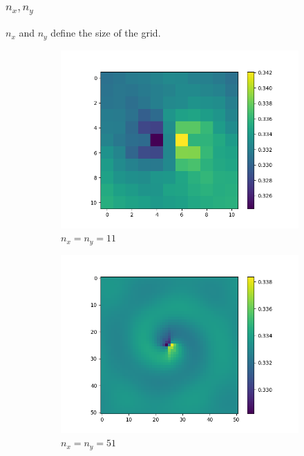 \documentclass{beamer}
\begin{document}
\begin{frame}[fragile]
\frametitle{$n_{x},n_{y}$}
$n_{x}$ and $n_{y}$ define the size of the grid.\\
\begin{figure}
\begin{subfigure}{0.32\textwidth}
\centering
\includegraphics[width=\textwidth]{img/P_001_nxy11.png}
\caption{$n_{x}=n_{y}=11$}
\end{subfigure}
\begin{subfigure}{0.32\textwidth}
\centering
\includegraphics[width=\textwidth]{img/P_001_nxy51.png}
\caption{$n_{x}=n_{y}=51$}
\end{subfigure}
\begin{subfigure}{0.32\textwidth}

\end{subfigure}
\end{figure}
\end{frame}
\end{document}
